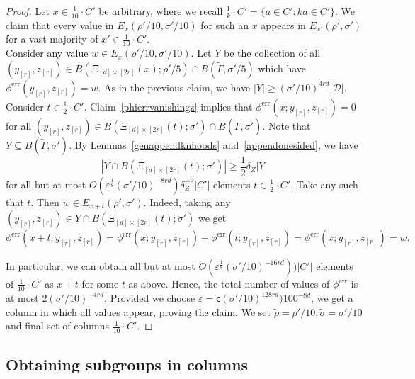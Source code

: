 \documentclass[a4paper,11pt]{article}
\numberwithin{theorem}{section}
\theoremstyle{definition}
\newcommand{\bsc}{\bm{\mathsf{c}}}
\begin{document}
\begin{proof}
    Let $x \in \frac{1}{10}\cdot C'$ be arbitrary, where we recall $\frac{1}{k}\cdot C' = \{a \in C' : ka \in C'\}$. We claim that every value in $E_x(\rho'/10, \sigma'/10)$ for such an $x$ appears in $E_{x'}(\rho', \sigma')$ for a vast majority of $x' \in \frac{1}{10} \cdot C'$.\\
    
    Consider any value $w \in E_x(\rho'/10, \sigma'/10)$. Let $Y$ be the collection of all $(y_{[r]}, z_{[r]}) \in B(\Xi_{[d] \times [2r]}(x); \rho'/5) \cap B(\tilde{\Gamma}, \sigma'/5)$ which have $\phi^{\text{err}}(y_{[r]}, z_{[r]}) = w$. As in the previous claim, we have $|Y| \geq (\sigma'/10)^{4rd}|\mathcal{D}|$.\\

    Consider $t \in \frac{1}{2}\cdot C'$. Claim~\ref{phierrvanishingz} implies that $\phi^{\text{err}}(x; y_{[r]}, z_{[r]}) = 0$ for all $(y_{[r]}, z_{[r]}) \in B(\Xi_{[d] \times [2r]}(t); \sigma') \cap B(\tilde{\Gamma}, \sigma')$. Note that $Y \subseteq B(\tilde{\Gamma}, \sigma')$. By Lemmas~\ref{genappendknhoods} and~\ref{appendonesided}, we have 
    \[|Y \cap B(\Xi_{[d] \times [2r]}(t); \sigma')| \geq \frac{1}{2}\delta_Z |Y|\]
    for all but at most $O(\varepsilon^{\frac{1}{8}} (\sigma'/10)^{-8rd}) \delta_Z^{-2}|C'|$ elements $t \in \frac{1}{2}\cdot C'$. Take any such that $t$. Then $w \in E_{x + t}(\rho', \sigma')$. Indeed, taking any $(y_{[r]}, z_{[r]}) \in Y \cap B(\Xi_{[d] \times [2r]}(t); \sigma')$ we get 
    \[\phi^{\text{err}}(x + t; y_{[r]}, z_{[r]}) = \phi^{\text{err}}(x; y_{[r]}, z_{[r]}) + \phi^{\text{err}}(t; y_{[r]}, z_{[r]}) = \phi^{\text{err}}(x; y_{[r]}, z_{[r]}) = w.\]

    In particular, we can obtain all but at most $O(\varepsilon^{\frac{1}{8}} (\sigma'/10)^{-16rd}))|C'|$ elements of $\frac{1}{10}\cdot C'$ as $x + t$ for some $t$ as above. Hence, the total number of values of $\phi^{\text{err}}$ is at most $2 (\sigma'/10)^{-4rd}$. Provided we choose $\varepsilon = \bsc (\sigma'/10)^{128rd})100^{-8d}$, we get a column in which all values appear, proving the claim. We set $\tilde{\rho} = \rho'/10, \tilde{\sigma} = \sigma'/10$ and final set of columns $\frac{1}{10} \cdot C'$.
\end{proof}

\subsection{Obtaining subgroups in columns}\label{subgroupsincolumnssubsec}
\end{document}
